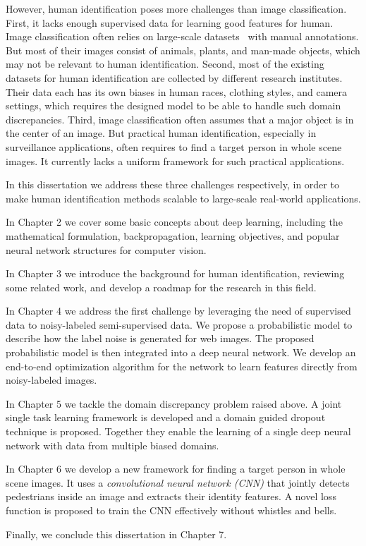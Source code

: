 However, human identification poses more challenges than image classification. First, it lacks enough supervised data for learning good features for human. Image classification often relies on large-scale datasets~\cite{deng2009imagenet
} with manual annotations. But most of their images consist of animals, plants, and man-made objects, which may not be relevant to human identification. Second, most of the existing datasets for human identification are collected by different research institutes. Their data each has its own biases in human races, clothing styles, and camera settings, which requires the designed model to be able to handle such domain discrepancies. Third, image classification often assumes that a major object is in the center of an image. But practical human identification, especially in surveillance applications, often requires to find a target person in whole scene images. It currently lacks a uniform framework for such practical applications.

In this dissertation we address these three challenges respectively, in order to make human identification methods scalable to large-scale real-world applications.

In Chapter 2 we cover some basic concepts about deep learning, including the mathematical formulation, backpropagation, learning objectives, and popular neural network structures for computer vision.

In Chapter 3 we introduce the background for human identification, reviewing some related work, and develop a roadmap for the research in this field.

In Chapter 4 we address the first challenge by leveraging the need of supervised data to noisy-labeled semi-supervised data. We propose a probabilistic model to describe how the label noise is generated for web images. The proposed probabilistic model is then integrated into a deep neural network. We develop an end-to-end optimization algorithm for the network to learn features directly from noisy-labeled images.

In Chapter 5 we tackle the domain discrepancy problem raised above. A joint single task learning framework is developed and a domain guided dropout technique is proposed. Together they enable the learning of a single deep neural network with data from multiple biased domains.

In Chapter 6 we develop a new framework for finding a target person in whole scene images. It uses a \emph{convolutional neural network (CNN)} that jointly detects pedestrians inside an image and extracts their identity features. A novel loss function is proposed to train the CNN effectively without whistles and bells.

Finally, we conclude this dissertation in Chapter 7.